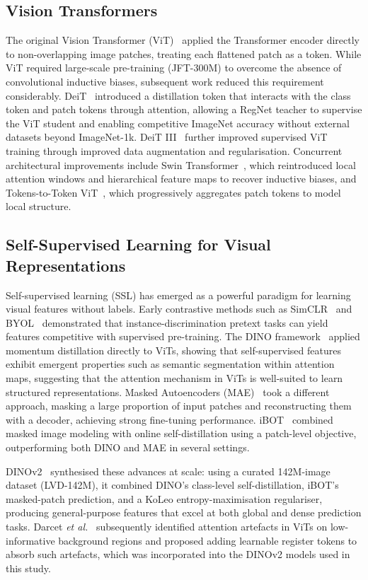 \documentclass[journal]{IEEEtran}
\begin{document}
\subsection{Vision Transformers}
The original Vision Transformer (ViT)~\cite{dosovitskiy2021vit} applied the Transformer encoder
directly to non-overlapping image patches, treating each flattened patch as a token. While ViT
required large-scale pre-training (JFT-300M) to overcome the absence of convolutional inductive
biases, subsequent work reduced this requirement considerably. DeiT~\cite{touvron2021deit}
introduced a distillation token that interacts with the class token and patch tokens through
attention, allowing a RegNet teacher to supervise the ViT student and enabling competitive
ImageNet accuracy without external datasets beyond ImageNet-1k. DeiT III~\cite{touvron2022deit3}
further improved supervised ViT training through improved data augmentation and regularisation.
Concurrent architectural improvements include Swin Transformer~\cite{liu2021swin}, which
reintroduced local attention windows and hierarchical feature maps to recover inductive biases,
and Tokens-to-Token ViT~\cite{yuan2021t2t}, which progressively aggregates patch tokens to model
local structure.

\subsection{Self-Supervised Learning for Visual Representations}
Self-supervised learning (SSL) has emerged as a powerful paradigm for learning visual features
without labels. Early contrastive methods such as SimCLR~\cite{chen2020simclr} and
BYOL~\cite{grill2020byol} demonstrated that instance-discrimination pretext tasks can yield
features competitive with supervised pre-training. The DINO framework~\cite{caron2021dino}
applied momentum distillation directly to ViTs, showing that self-supervised features
exhibit emergent properties such as semantic segmentation within attention maps, suggesting
that the attention mechanism in ViTs is well-suited to learn structured representations.
Masked Autoencoders (MAE)~\cite{he2022mae} took a different approach, masking a large proportion
of input patches and reconstructing them with a decoder, achieving strong fine-tuning performance.
iBOT~\cite{zhou2022ibot} combined masked image modeling with online self-distillation using
a patch-level objective, outperforming both DINO and MAE in several settings.

DINOv2~\cite{oquab2023dinov2} synthesised these advances at scale: using a curated 142M-image
dataset (LVD-142M), it combined DINO's class-level self-distillation, iBOT's masked-patch
prediction, and a KoLeo entropy-maximisation regulariser, producing general-purpose features
that excel at both global and dense prediction tasks. Darcet \textit{et al.}~\cite{darcet2023registers}
subsequently identified attention artefacts in ViTs on low-informative background regions and
proposed adding learnable register tokens to absorb such artefacts, which was incorporated
into the DINOv2 models used in this study.
\end{document}

